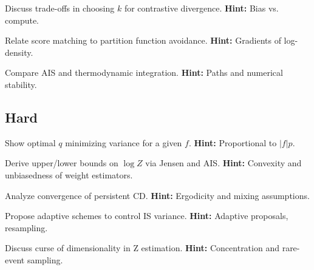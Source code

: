 \begin{problem}[CD-k]
Discuss trade-offs in choosing $k$ for contrastive divergence.
\textbf{Hint:} Bias vs. compute.
\end{problem}

\begin{problem}
Relate score matching to partition function avoidance.
\textbf{Hint:} Gradients of log-density.
\end{problem}

\begin{problem}
Compare AIS and thermodynamic integration.
\textbf{Hint:} Paths and numerical stability.
\end{problem}

\subsection*{Hard}
\begin{problem}
Show optimal $q$ minimizing variance for a given $f$.
\textbf{Hint:} Proportional to $|f|p$.
\end{problem}

\begin{problem}
Derive upper/lower bounds on $\log Z$ via Jensen and AIS.
\textbf{Hint:} Convexity and unbiasedness of weight estimators.
\end{problem}

\begin{problem}
Analyze convergence of persistent CD.
\textbf{Hint:} Ergodicity and mixing assumptions.
\end{problem}

\begin{problem}
Propose adaptive schemes to control IS variance.
\textbf{Hint:} Adaptive proposals, resampling.
\end{problem}

\begin{problem}
Discuss curse of dimensionality in Z estimation.
\textbf{Hint:} Concentration and rare-event sampling.
\end{problem}


